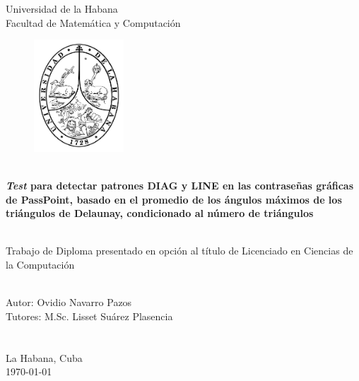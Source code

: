 \documentclass[12pt]{report}
\begin{document}
\begin{titlepage}
    \centering
    {\Huge {Universidad de la Habana}}\\[1cm]
    {\Huge {Facultad de Matemática y Computación }}\\[0.5cm]
 
    \begin{figure}[h]
    	\centering
    	\includegraphics[width=0.3\textwidth]{logoUH.png}
    	
    \end{figure}
    {\noindent\hrulefill}\\[0.2cm]
    
    {\Large\textbf{{\textit{Test} para detectar patrones DIAG y LINE  en las contraseñas gráficas de PassPoint, basado en el promedio de los ángulos máximos de los triángulos de Delaunay, condicionado al número de triángulos }}}\\[0.1cm]
    {\noindent\hrulefill}\\[1.0cm]
    \begin{minipage}{0.8\textwidth}
    \begin{center}
    	{\Large Trabajo de Diploma presentado en opción al título de Licenciado en Ciencias de la Computación}
    	
    \end{center}
    \end{minipage}\\[1cm]
    
    
 
    
    {\Large {Autor: Ovidio Navarro Pazos}}\\[2cm]
   	{\Large {Tutores: M.Sc. Lisset Suárez Plasencia}}\\
   	\\
   	\\
   	[2.0cm]
   	
   	{\large{La Habana, Cuba}}\\
    {\large  \today}
\end{titlepage}
\end{document}
